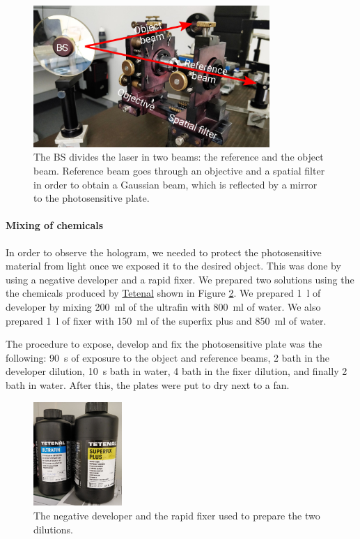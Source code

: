 \documentclass[11pt,a4paper]{article}
\begin{document}
\begin{figure}[ht]
\centering
\includegraphics[width=0.8\textwidth]{Optical_bench_1}
\caption{The BS divides the laser in two beams: the reference and the object beam. Reference beam goes through an objective and a spatial filter in order to obtain a Gaussian beam, which is reflected by a mirror to the photosensitive plate.}
\label{fig:optical_bench_1}
\end{figure}

\paragraph{Mixing of chemicals}
In order to observe the hologram, we needed to protect the photosensitive material from light once we exposed it to the desired object. This was done by using a negative developer and a rapid fixer. We prepared two solutions using the the chemicals produced by \href{https://www.tetenal.com/}{Tetenal} shown in Figure \ref{fig:chemicals}. We prepared \SI{1}{\litre} of developer by mixing \SI{200}{\milli\litre} of the ultrafin with \SI{800}{\milli\litre} of water. We also prepared \SI{1}{\litre} of fixer with \SI{150}{\milli\litre} of the superfix plus and \SI{850}{\milli\litre} of water.

The procedure to expose, develop and fix the photosensitive plate was the following: \SI{90}{\second} of exposure to the object and reference beams, \SI{2}{\min} bath in the developer dilution, \SI{10}{\second} bath in water, \SI{4}{\min} bath in the fixer dilution, and finally \SI{2}{\min} bath in water. After this, the plates were put to dry next to a fan.

\begin{figure}[ht]
\centering
\includegraphics[width=0.3\textwidth]{Chemicals}
\caption{The negative developer and the rapid fixer used to prepare the two dilutions.}
\label{fig:chemicals}
\end{figure}
\end{document}
